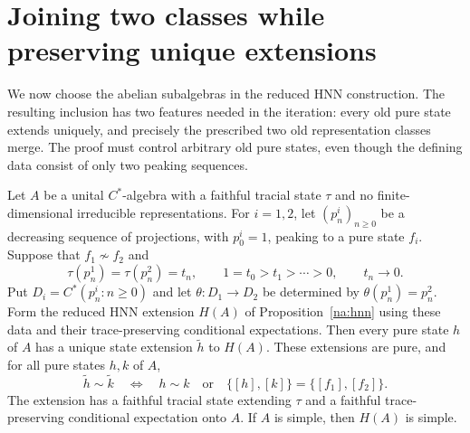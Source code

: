 \section{Joining two classes while preserving unique extensions}
\label{sec:bridge}

We now choose the abelian subalgebras in the reduced HNN construction.
The resulting inclusion has two features needed in the iteration: every
old pure state extends uniquely, and precisely the prescribed two old
representation classes merge. The proof must control arbitrary old
pure states, even though the defining data consist of only two peaking
sequences.

\begin{theorem}\label{na:bridge}
Let $A$ be a unital $C^*$-algebra with a faithful tracial state $\tau$
and no finite-dimensional irreducible representations. For $i=1,2$,
let $(p_n^i)_{n\geq0}$ be a decreasing sequence of projections, with
$p_0^i=1$, peaking to a pure state $f_i$. Suppose that $f_1\not\sim f_2$
and
\[
 \tau(p_n^1)=\tau(p_n^2)=t_n,
 \qquad 1=t_0>t_1>\cdots>0,
 \qquad t_n\longrightarrow0.
\]
Put $D_i=C^*(p_n^i:n\geq0)$ and let
$\theta:D_1\to D_2$ be determined by $\theta(p_n^1)=p_n^2$.
Form the reduced HNN extension $H(A)$ of Proposition~\ref{na:hnn}
using these data and their trace-preserving conditional expectations.
Then every pure state $h$ of $A$ has a unique state extension
$\widetilde h$ to $H(A)$. These extensions are pure, and for all pure
states $h,k$ of $A$,
\[
 \widetilde h\sim\widetilde k
 \quad\Longleftrightarrow\quad
 h\sim k
 \quad\text{or}\quad
 \{[h],[k]\}=\{[f_1],[f_2]\}.
\]
The extension has a faithful tracial state extending $\tau$ and a
faithful trace-preserving conditional expectation onto $A$. If $A$ is
simple, then $H(A)$ is simple.
\end{theorem}

